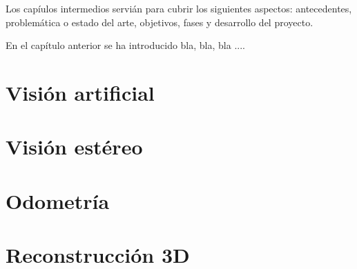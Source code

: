 

Los capíulos intermedios servián para cubrir los siguientes aspectos:
antecedentes, problemática o estado del arte, objetivos, fases y desarrollo del proyecto.

En el capítulo anterior se ha introducido bla, bla, bla ....


\section{Visión artificial}
\label{2:sec:1}

\section{Visión estéreo}
\label{2:sec:2}

\section{Odometría}
\label{2:sec:3}

\section{Reconstrucción 3D}
\label{2:sec:4}
